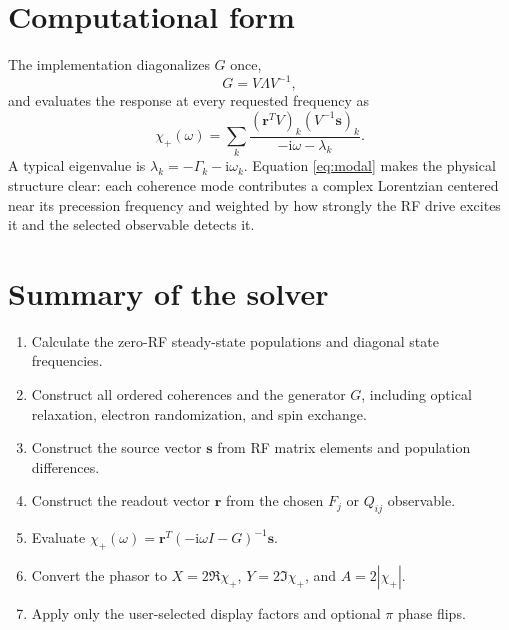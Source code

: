 \documentclass[11pt]{article}
\newcommand{\ii}{\mathrm{i}}
\begin{document}
\section{Computational form}

The implementation diagonalizes $G$ once,
\begin{equation}
  G=V\Lambda V^{-1},
\end{equation}
and evaluates the response at every requested frequency as
\begin{equation}
  \chi_+(\omega)
  =\sum_k
  \frac{(\bm r^TV)_k(V^{-1}\bm s)_k}
       {-\ii\omega-\lambda_k}.
  \label{eq:modal}
\end{equation}
A typical eigenvalue is $\lambda_k=-\Gamma_k-\ii\omega_k$.  Equation
\eqref{eq:modal} makes the physical structure clear: each coherence mode
contributes a complex Lorentzian centered near its precession frequency and
weighted by how strongly the RF drive excites it and the selected observable
detects it.

\section{Summary of the solver}

\begin{enumerate}
  \item Calculate the zero-RF steady-state populations and diagonal state
        frequencies.
  \item Construct all ordered coherences and the generator $G$, including
        optical relaxation, electron randomization, and spin exchange.
  \item Construct the source vector $\bm s$ from RF matrix elements and
        population differences.
  \item Construct the readout vector $\bm r$ from the chosen $F_j$ or
        $Q_{ij}$ observable.
  \item Evaluate $\chi_+(\omega)=\bm r^T(-\ii\omega I-G)^{-1}\bm s$.
  \item Convert the phasor to $X=2\Re\chi_+$,
        $Y=2\Im\chi_+$, and $A=2|\chi_+|$.
  \item Apply only the user-selected display factors and optional $\pi$ phase
        flips.
\end{enumerate}
\end{document}
